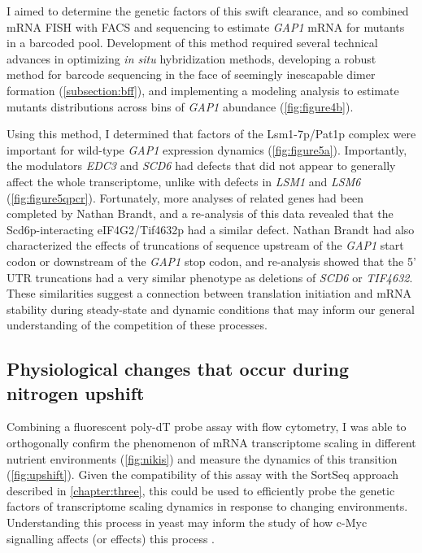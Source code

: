 I aimed to determine the genetic factors of this swift clearance, and
so combined mRNA FISH with FACS and sequencing to estimate
\textit{GAP1} mRNA for mutants in a barcoded pool. Development of this
method required several technical advances in optimizing 
\textit{in situ} hybridization methods, developing a robust method 
for barcode sequencing in the face of seemingly inescapable dimer 
formation (\autoref{subsection:bff}), and implementing a modeling
analysis to estimate mutants distributions across bins of 
\textit{GAP1} abundance (\autoref{fig:figure4b}). 

Using this method, I determined that factors of the Lsm1-7p/Pat1p
complex were important for wild-type \textit{GAP1} expression
dynamics (\autoref{fig:figure5a}). Importantly, the modulators
\textit{EDC3} and \textit{SCD6} had defects that did not appear
to generally affect the whole transcriptome, unlike with defects in
\textit{LSM1} and \textit{LSM6} (\autoref{fig:figure5qpcr}).
Fortunately, more analyses of related genes had been completed
by Nathan Brandt, and a re-analysis of this data revealed that 
the Scd6p-interacting eIF4G2/Tif4632p had a similar defect.
Nathan Brandt had also characterized the effects of truncations of
sequence upstream of the \textit{GAP1} start codon or downstream
of the \textit{GAP1} stop codon, and re-analysis showed that the 5'
UTR truncations had a very similar phenotype as deletions of
\textit{SCD6} or \textit{TIF4632}.
These similarities suggest a connection between translation initiation
and mRNA stability during steady-state and dynamic conditions that
may inform our general understanding of the competition of these 
processes.

\subsection{Physiological changes that occur during nitrogen upshift}

Combining a fluorescent poly-dT probe assay
\parencite{amberg1992isolation} with flow cytometry, I was able to
orthogonally confirm the phenomenon of mRNA transcriptome scaling
in different nutrient environments (\autoref{fig:nikis}) and 
measure the dynamics of this transition (\autoref{fig:upshift}).
Given the compatibility of this assay with the SortSeq approach
described in \autoref{chapter:three}, this could be used to efficiently probe the 
genetic factors of transcriptome scaling dynamics in response to
changing environments. Understanding this process in yeast may
inform the study of how c-Myc signalling affects (or effects) 
this process \parencite{nie2012c}.

